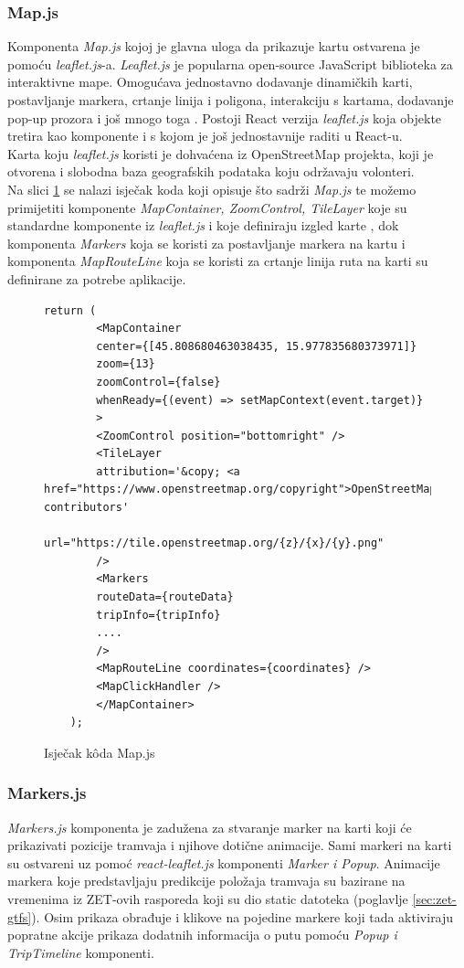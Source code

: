 \documentclass[zavrsnirad]{fer}
\begin{document}
\subsubsection{Map.js}
Komponenta \textit{Map.js} kojoj je glavna uloga da prikazuje kartu ostvarena je pomoću \textit{leaflet.js}-a.
\textit{Leaflet.js} je popularna open-source JavaScript biblioteka za interaktivne mape. Omogućava jednostavno dodavanje dinamičkih karti, postavljanje markera, crtanje linija i poligona, interakciju s kartama, dodavanje pop-up prozora i još mnogo toga \cite{leaflet}.
Postoji React verzija \textit{leaflet.js} koja objekte tretira kao komponente i s kojom je još jednostavnije raditi u React-u.\\
Karta koju \textit{leaflet.js} koristi je dohvaćena iz OpenStreetMap projekta, koji je otvorena i slobodna baza geografskih podataka koju održavaju volonteri.\\

Na slici \ref{slk:mapjs} se nalazi isječak koda koji opisuje što sadrži \textit{Map.js} te možemo primijetiti komponente \textit{MapContainer, ZoomControl, TileLayer} koje su standardne komponente iz \textit{leaflet.js} i koje definiraju izgled karte , dok komponenta \textit{Markers} koja se koristi za postavljanje markera na kartu i komponenta \textit{MapRouteLine} koja se koristi za crtanje linija ruta na karti su definirane za potrebe aplikacije.

\begin{figure}[H]
	\centering
	\begin{minipage}{0.9\linewidth}
		\begin{lstlisting}[language=JSX]
	return (
		<MapContainer
		center={[45.808680463038435, 15.977835680373971]}
		zoom={13}
		zoomControl={false}
		whenReady={(event) => setMapContext(event.target)}
		>
		<ZoomControl position="bottomright" />
		<TileLayer
		attribution='&copy; <a href="https://www.openstreetmap.org/copyright">OpenStreetMap</a> contributors'
		url="https://tile.openstreetmap.org/{z}/{x}/{y}.png"
		/>
		<Markers
		routeData={routeData}
		tripInfo={tripInfo}
		....
		/>
		<MapRouteLine coordinates={coordinates} />
		<MapClickHandler />
		</MapContainer>
	);
		\end{lstlisting}
	\end{minipage}
	\caption{Isječak k\^oda Map.js}
	\label{slk:mapjs}
\end{figure}

\subsubsection{Markers.js}
\textit{Markers.js} komponenta je zadužena za stvaranje marker na karti koji će prikazivati pozicije tramvaja i njihove dotične animacije. Sami markeri na karti su ostvareni uz pomoć \textit{react-leaflet.js} komponenti \textit{Marker i Popup}. Animacije markera koje predstavljaju predikcije položaja tramvaja su bazirane na vremenima iz ZET-ovih rasporeda koji su dio static datoteka (poglavlje \ref{sec:zet-gtfs}). Osim prikaza obrađuje i klikove na pojedine markere koji tada aktiviraju popratne akcije prikaza dodatnih informacija o putu pomoću \textit{Popup i TripTimeline} komponenti.
\end{document}
